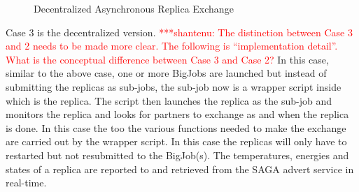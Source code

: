 \documentclass[a4paper,10pt]{article}
\newcommand{\jhanote}[1]{ {\textcolor{red} { ***shantenu: #1 }}}
\newcommand{\jhanote}[1]{}
\begin{document}
\begin{figure}
\centering


\caption{\small Decentralized Asynchronous Replica Exchange}
\label{fig:decentralized}
\end{figure}

Case 3 is the decentralized version. \jhanote{The distinction between
  Case 3 and 2 needs to be made more clear. The following is
  ``implementation detail''. What is the conceptual difference between
  Case 3 and Case 2?}  In this case, similar to the above case, one or
more BigJobs are launched but instead of submitting the replicas as
sub-jobs, the sub-job now is a wrapper script inside which is the
replica. The script then launches the replica as the sub-job and
monitors the replica and looks for partners to exchange as and when
the replica is done. In this case the too the various functions needed
to make the exchange are carried out by the wrapper script. In this
case the replicas will only have to restarted but not resubmitted to
the BigJob(s). The temperatures, energies and states of a replica are
reported to and retrieved from the SAGA advert service in real-time.
\end{document}
